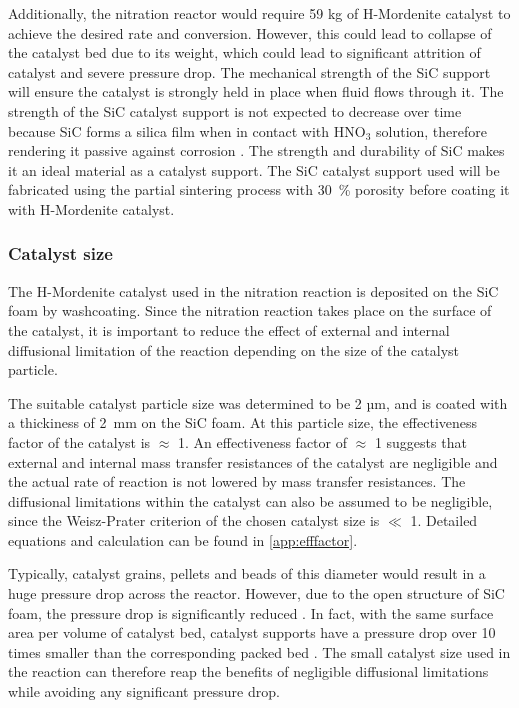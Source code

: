 Additionally, the nitration reactor would require 59 kg of H-Mordenite catalyst to achieve the desired rate and conversion. However, this could lead to collapse of the catalyst bed due to its weight, which could lead to significant attrition of catalyst and severe pressure drop. The mechanical strength of the SiC support will ensure the catalyst is strongly held in place when fluid flows through it. The strength of the SiC catalyst support is not expected to decrease over time because SiC forms a silica film when in contact with HNO$_3$ solution, therefore rendering it passive against corrosion \cite{cook_corrosion_2013}. The strength and durability of SiC makes it an ideal material as a catalyst support. The SiC catalyst support used will be fabricated using the partial sintering process with \SI{30}{\%} porosity before coating it with H-Mordenite catalyst.

\subsubsection{Catalyst size}
The H-Mordenite catalyst used in the nitration reaction is deposited on the SiC foam by washcoating. Since the nitration reaction takes place on the surface of the catalyst, it is important to reduce the effect of external and internal diffusional limitation of the reaction depending on the size of the catalyst particle.  

The suitable catalyst particle size was determined to be 2 µm, and is coated with a thickiness of \SI{2}{\milli \meter} on the SiC foam. At this particle size, the effectiveness factor of the catalyst is $\approx$ 1. An effectiveness factor of $\approx$ 1 suggests that external and internal mass transfer resistances of the catalyst are negligible and the actual rate of reaction is not lowered by mass transfer resistances. The diffusional limitations within the catalyst can also be assumed to be negligible, since the Weisz-Prater criterion of the chosen catalyst size is $\ll$ 1. Detailed equations and calculation can be found in \cref{app:efffactor}.

Typically, catalyst grains, pellets and beads of this diameter would result in a huge pressure drop across the reactor. However, due to the open structure of SiC foam, the pressure drop is significantly reduced \cite{duong-viet_silicon_2016}. In fact, with the same surface area per volume of catalyst bed, catalyst supports have a pressure drop over 10 times smaller than the corresponding packed bed \cite{richardson_properties_2000}. The small catalyst size used in the reaction can therefore reap the benefits of negligible diffusional limitations while avoiding any significant pressure drop.


